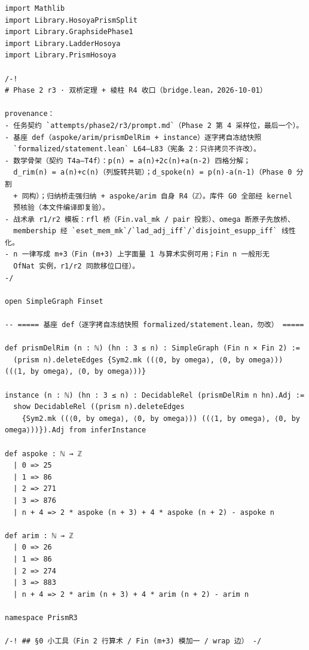 \documentclass[11pt]{article}
\begin{document}
\begin{lstlisting}[basicstyle=\ttfamily\footnotesize,caption={Complete proof
file of Theorems~\ref{thm:spoke} and~\ref{thm:rim}, verbatim lines 1--1857
(whole file) of \texttt{attempts/phase2/r3/bridge.lean} (sha256
\texttt{399ee81f}). Mixed line endings on the working disk (the file is CRLF
throughout) are spliced LF-normalised per the chorded/ladder/hosoya precedent;
the byte-exact original ships in \texttt{proofs/}.},label={lst:proof}]
import Mathlib
import Library.HosoyaPrismSplit
import Library.GraphsidePhase1
import Library.LadderHosoya
import Library.PrismHosoya

/-!
# Phase 2 r3 · 双桥定理 + 棱柱 R4 收口（bridge.lean，2026-10-01）

provenance：
- 任务契约 `attempts/phase2/r3/prompt.md`（Phase 2 第 4 采样位，最后一个）。
- 基座 def（aspoke/arim/prismDelRim + instance）逐字拷自冻结快照
  `formalized/statement.lean` L64–L83（宪条 2：只许拷贝不许改）。
- 数学骨架（契约 T4a–T4f）：p(n) = a(n)+2c(n)+a(n-2) 四格分解；
  d_rim(n) = a(n)+c(n)（列旋转共轭）；d_spoke(n) = p(n)-a(n-1)（Phase 0 分割
  + 同构）；归纳桥走强归纳 + aspoke/arim 自身 R4（ℤ）。库件 G0 全部经 kernel
  预核验（本文件编译即复验）。
- 战术承 r1/r2 模板：rfl 桥（Fin.val_mk / pair 投影）、omega 断原子先放桥、
  membership 经 `eset_mem_mk`/`lad_adj_iff`/`disjoint_esupp_iff` 线性化。
- n 一律写成 m+3（Fin (m+3) 上字面量 1 与算术实例可用；Fin n 一般形无
  OfNat 实例，r1/r2 同款移位口径）。
-/

open SimpleGraph Finset

-- ===== 基座 def（逐字拷自冻结快照 formalized/statement.lean，勿改） =====

def prismDelRim (n : ℕ) (hn : 3 ≤ n) : SimpleGraph (Fin n × Fin 2) :=
  (prism n).deleteEdges {Sym2.mk ((⟨0, by omega⟩, ⟨0, by omega⟩)) ((⟨1, by omega⟩, ⟨0, by omega⟩))}

instance (n : ℕ) (hn : 3 ≤ n) : DecidableRel (prismDelRim n hn).Adj :=
  show DecidableRel ((prism n).deleteEdges
    {Sym2.mk ((⟨0, by omega⟩, ⟨0, by omega⟩)) ((⟨1, by omega⟩, ⟨0, by omega⟩))}).Adj from inferInstance

def aspoke : ℕ → ℤ
  | 0 => 25
  | 1 => 86
  | 2 => 271
  | 3 => 876
  | n + 4 => 2 * aspoke (n + 3) + 4 * aspoke (n + 2) - aspoke n

def arim : ℕ → ℤ
  | 0 => 26
  | 1 => 86
  | 2 => 274
  | 3 => 883
  | n + 4 => 2 * arim (n + 3) + 4 * arim (n + 2) - arim n

namespace PrismR3

/-! ## §0 小工具（Fin 2 行算术 / Fin (m+3) 模加一 / wrap 边） -/


\end{lstlisting}
\end{document}
